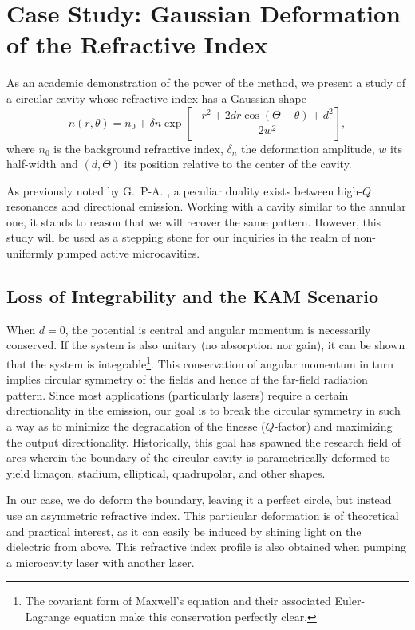 \section{Case Study: Gaussian Deformation of the Refractive Index}
As an academic demonstration of the power of the method, 
we present a study of a circular cavity whose refractive index
has a Gaussian shape
  \begin{equation}
   n(r,\theta) = n_0 + \delta n\exp\left[-\frac{r^2+2dr\cos\left(\Theta-\theta\right)+d^2}{2w^2}\right],
  \end{equation}
where $n_0$ is the background refractive index, $\delta _n$ the 
deformation amplitude, $w$ its half-width and $(d,\Theta)$
its position relative to the center of the cavity. 

As previously noted by G.~P-A. \cite{GAP2013}, a peculiar
duality exists between high-$Q$ resonances and directional emission.
Working with a cavity similar to the annular one, it stands to reason
that we will recover the same pattern. However, this study will be used
as a stepping stone for our inquiries in the realm of non-uniformly
pumped active microcavities. 

\subsection{Loss of Integrability and the KAM Scenario}
When $d=0$, the potential is central and angular momentum is 
necessarily conserved. If the system is also unitary
(no absorption nor gain), it can be shown that the system is
integrable\footnote{The covariant form of Maxwell's equation and their
associated Euler-Lagrange equation make this conservation perfectly clear.}. 
This conservation of angular momentum in turn
implies circular symmetry of the fields and hence of the 
far-field radiation pattern. Since most applications (particularly lasers)
require a certain directionality in the emission, our goal is to break 
the circular symmetry in such a way as to minimize the degradation of the
finesse ($Q$-factor) and maximizing the output directionality. Historically, 
this goal has spawned the research field of \glspl{arc} wherein the boundary
of the circular cavity is parametrically deformed to yield limaçon, stadium, 
elliptical, quadrupolar, and other shapes. 

In our case, we do deform the boundary, leaving it a perfect circle, 
but instead use an asymmetric refractive index. This particular deformation
is of theoretical and practical interest, as it can easily be induced
by shining light on the dielectric from above. This refractive
index profile is also obtained when pumping a microcavity laser
with another laser.

